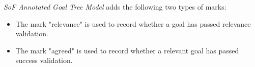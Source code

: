 \documentclass{beamer}
\begin{document}
\begin{frame}{\emph{SoF Annotated Goal Tree Model} adds the following two types of marks:}            
  \begin{itemize}
  \item
    The mark "relevance" is used to record whether a goal has passed relevance validation.
  \item
    The mark "agreed" is used to record whether a relevant goal has passed success validation.
  \end{itemize}
\end{frame}


\end{document}
